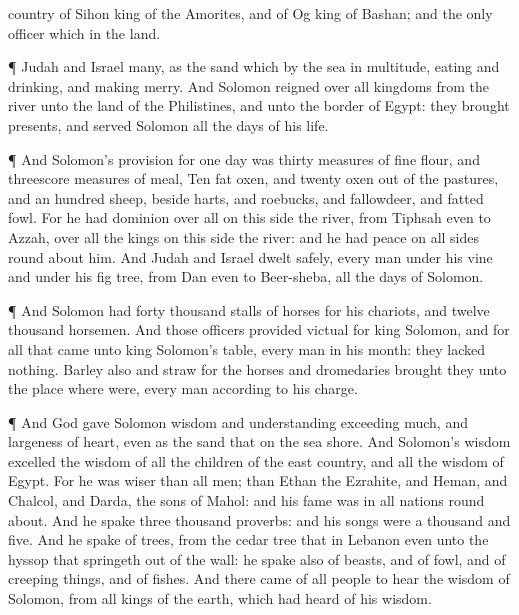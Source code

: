 {country of
Sihon
king of the
Amorites, and of
Og
king of
Bashan; and
{} the
only
officer which
{} in the
land.
\par }{\PP {}¶
Judah and
Israel
{}
many, as the
sand which
{} by the
sea in
multitude,
eating and
drinking, and making
merry.
And
Solomon
reigned over all
kingdoms from the
river unto the
land of the
Philistines, and unto the
border of
Egypt: they
brought
presents, and
served
Solomon all the
days of his
life.
\par }{\PP {}¶ And
Solomon’s
provision for
one
day was
thirty
measures of fine
flour, and
threescore
measures of
meal,
Ten
fat
oxen, and
twenty
oxen out of the
pastures, and an
hundred
sheep, beside
harts, and
roebucks, and
fallowdeer, and
fatted
fowl.
For he had
dominion over all
{} on this
side the
river, from
Tiphsah even to
Azzah, over all the
kings on this
side the
river: and he had
peace on all
sides round
about him.
And
Judah and
Israel
dwelt
safely, every
man under his
vine and under his fig
tree, from
Dan even to
Beer-sheba, all the
days of
Solomon.
\par }{\PP {}¶ And
Solomon had
forty
thousand
stalls of
horses for his
chariots, and
twelve
thousand
horsemen.
And those
officers provided
victual for
king
Solomon, and for all that
came unto
king
Solomon’s
table, every
man in his
month: they
lacked
nothing.
Barley also and
straw for the
horses and
dromedaries
brought they unto the
place where
{} were, every
man according to his
charge.
\par }{\PP {}¶ And
God
gave
Solomon
wisdom and
understanding
exceeding
much, and
largeness of
heart, even as the
sand that
{} on the
sea
shore.
And
Solomon’s
wisdom
excelled the
wisdom of all the
children of the east
country, and all the
wisdom of
Egypt.
For he was
wiser than all
men; than
Ethan the
Ezrahite, and
Heman, and
Chalcol, and
Darda, the
sons of
Mahol: and his
fame was in all
nations round
about.
And he
spake
three
thousand
proverbs: and his
songs were a
thousand and
five.
And he
spake of
trees, from the cedar
tree that
{} in
Lebanon even unto the
hyssop that springeth
out of the
wall: he
spake also of
beasts, and of
fowl, and of creeping
things, and of
fishes.
And there
came of all
people to
hear the
wisdom of
Solomon, from all
kings of the
earth, which had
heard of his
wisdom.

}
